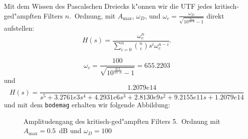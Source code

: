 \nit Mit dem Wissen des Pascalschen Dreiecks k"onnen wir die UTF jedes kritisch-ged"ampften Filters $n.$~Ordnung, mit $A_{\text{max}}$, $\omega_D$, und $\omega_c=\frac{\omega_D}{\sqrt{10^{\frac{A_{\text{max}}}{10\cdot n}}-1}}$ direkt aufstellen: 
\begin{equation}
H(s)=\frac{\omega_c^n}{\sum\limits_{i=0}^{n} {n \choose i} s^i\omega_c^{n-i} }.
\end{equation}

\begin{equation*}
\omega_c=\frac{100}{\sqrt{10^{\frac{0.5}{10\cdot n}}-1}}=655.2203
\end{equation*}
und 
\begin{equation*}
H(s)=\frac{1.2079e14}{s^5+3.2761e3s^4+4.2931e6s^3+2.8130e9s^2+9.2155e11s+1.2079e14}
\end{equation*}
und mit dem {\tt bodemag} erhalten wir folgende Abbildung:
\begin{figure}[!htb]\vspace*{-3mm}
\begin{center}
  \vspace*{-4mm}\caption{Amplitudengang des kritisch-ged"ampften Filters 5.~Ordnung mit $A_{\text{max}}=0.5$~dB und $\omega_D=100$}
\end{center}
\vspace*{-6mm}
\end{figure}




